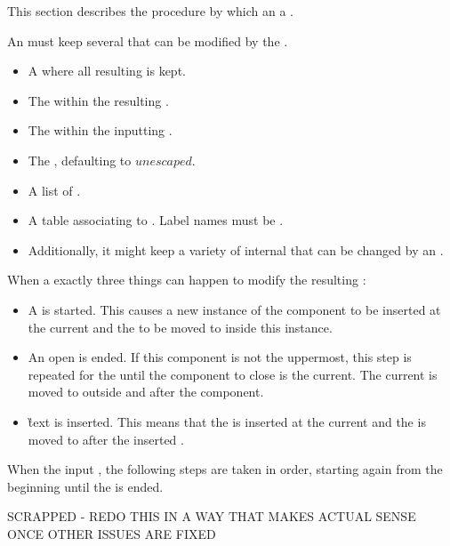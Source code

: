 This section describes the procedure by which an   a .

An  must keep several  that can be modified by the .

\begin{itemize}
\item A   where all resulting  is kept.
\item The  within the resulting .
\item The  within the inputting .
\item The , defaulting to \inline$unescaped$.
\item A list of .
\item A table associating  to . Label names must be .
\item Additionally, it might keep a variety of internal  that can be changed by an .
\end{itemize}

When  a  exactly three things can happen to modify the resulting :

\begin{itemize}
\item A  is started. This causes a new instance of the component to be inserted at the current  and the  to be moved to inside this instance.
\item An open  is ended. If this component is not the uppermost, this step is repeated for the  until the component to close is the current. The current  is moved to outside and after the component.
\item \G{text} is inserted. This means that the  is inserted at the current  and the  is moved to after the inserted .
\end{itemize}

When  the input , the following steps are taken in order, starting again from the beginning until the   is ended.

SCRAPPED - REDO THIS IN A WAY THAT MAKES ACTUAL SENSE ONCE OTHER ISSUES ARE FIXED

